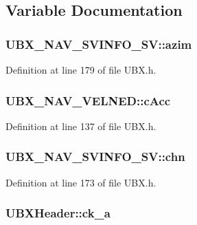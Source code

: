 \subsection{Variable Documentation}
\hypertarget{group___g_s_p_module_ga74c4856a9ce3011e1de4fb51a80062dc}{
\subsubsection[{azim}]{ U\-B\-X\-\_\-\-N\-A\-V\-\_\-\-S\-V\-I\-N\-F\-O\-\_\-\-S\-V\-::azim}}\label{group___g_s_p_module_ga74c4856a9ce3011e1de4fb51a80062dc}


Definition at line 179 of file U\-B\-X.\-h.

\hypertarget{group___g_s_p_module_ga8740fa2ac06cfb2d09b132c973a99887}{
\subsubsection[{c\-Acc}]{ U\-B\-X\-\_\-\-N\-A\-V\-\_\-\-V\-E\-L\-N\-E\-D\-::c\-Acc}}\label{group___g_s_p_module_ga8740fa2ac06cfb2d09b132c973a99887}


Definition at line 137 of file U\-B\-X.\-h.

\hypertarget{group___g_s_p_module_ga51b387f250ae37f8d3fa45cdd6adca45}{
\subsubsection[{chn}]{ U\-B\-X\-\_\-\-N\-A\-V\-\_\-\-S\-V\-I\-N\-F\-O\-\_\-\-S\-V\-::chn}}\label{group___g_s_p_module_ga51b387f250ae37f8d3fa45cdd6adca45}


Definition at line 173 of file U\-B\-X.\-h.

\hypertarget{group___g_s_p_module_ga151b080d3305855bcf4fb0c8042d6b7e}{
\subsubsection[{ck\-\_\-a}]{ U\-B\-X\-Header\-::ck\-\_\-a}}\label{group___g_s_p_module_ga151b080d3305855bcf4fb0c8042d6b7e}


